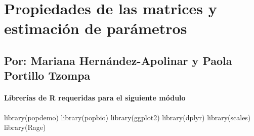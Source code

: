 \documentclass[
  12pt,
  letterpaper,
]{book}
\author{}
\date{}
\newenvironment{Shaded}{\begin{snugshade}}{\end{snugshade}}
\newcommand{\FunctionTok}[1]{\textcolor[rgb]{0.28,0.35,0.67}{#1}}
\newcommand{\NormalTok}[1]{\textcolor[rgb]{0.00,0.23,0.31}{#1}}
\renewcommand*\contentsname{Table of contents}
\newcommand\contentsname{Table of contents}
\begin{document}
\frontmatter

\renewcommand*\contentsname{Table of contents}
{
\hypersetup{linkcolor=}
\setcounter{tocdepth}{2}
\tableofcontents
}

\mainmatter
\chapter{Propiedades de las matrices y estimación de
parámetros}\label{propiedades-de-las-matrices-y-estimaciuxf3n-de-paruxe1metros}

\section{Por: Mariana Hernández-Apolinar y Paola Portillo
Tzompa}\label{por-mariana-hernuxe1ndez-apolinar-y-paola-portillo-tzompa}

\subsubsection{Librerías de R requeridas para el siguiente
módulo}\label{libreruxedas-de-r-requeridas-para-el-siguiente-muxf3dulo}

\begin{Shaded}
\begin{Highlighting}[]
\FunctionTok{library}\NormalTok{(popdemo)}
\FunctionTok{library}\NormalTok{(popbio)}
\FunctionTok{library}\NormalTok{(ggplot2)}
\FunctionTok{library}\NormalTok{(dplyr)}
\FunctionTok{library}\NormalTok{(scales)}
\FunctionTok{library}\NormalTok{(Rage)}
\end{Highlighting}
\end{Shaded}
\end{document}
